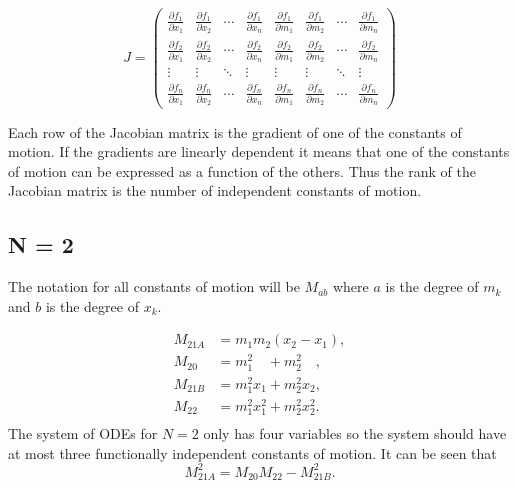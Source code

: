 \documentclass[english,master]{liumaiex}
\theoremstyle{plain}
\theoremstyle{definition}
\begin{document}
\begin{equation}
	J = 
	\begin{pmatrix}
		\frac{\partial f_1}{\partial x_1} & \frac{\partial f_1}{\partial x_2} & \cdots & \frac{\partial f_1}{\partial x_n} & \frac{\partial f_1}{\partial m_1} & \frac{\partial f_1}{\partial m_2} & \cdots & \frac{\partial f_1}{\partial m_n} \\
		\frac{\partial f_2}{\partial x_1} & \frac{\partial f_2}{\partial x_2} & \cdots & \frac{\partial f_2}{\partial x_n} & \frac{\partial f_2}{\partial m_1} & \frac{\partial f_2}{\partial m_2} & \cdots & \frac{\partial f_2}{\partial m_n} \\
		\vdots & \vdots & \ddots & \vdots & \vdots & \vdots & \ddots & \vdots \\
		\frac{\partial f_n}{\partial x_1} & \frac{\partial f_n}{\partial x_2} & \cdots & \frac{\partial f_n}{\partial x_n} & \frac{\partial f_n}{\partial m_1} & \frac{\partial f_n}{\partial m_2} & \cdots & \frac{\partial f_n}{\partial m_n}
	\end{pmatrix}
\end{equation}

Each row of the Jacobian matrix is the gradient of one of the constants of motion. If the gradients are linearly dependent it means that one of the constants of motion can be expressed as a function of the others. Thus the rank of the Jacobian matrix is the number of independent constants of motion.

\subsection*{N = 2}

The notation for all constants of motion will be $M_{ab}$ where $a$ is the degree of $m_k$ and $b$ is the degree of $x_k$.

\begin{align}
	M_{21A} &= m_1 m_2 (x_2 - x_1), \\
	M_{20\phantom{A}} &= m_1^2\phantom{x_1} + m_2^2\phantom{x_2}, \\
	M_{21B} &= m_1^2 x_1 + m_2^2 x_2, \\
	M_{22\phantom{A}} &= m_1^2 x_1^2 + m_2^2 x_2^2. \\
\end{align}
%
The system of ODEs for $N = 2$ only has four variables so the system should have at most three functionally independent constants of motion. It can be seen that
\begin{equation}
	M_{21A}^2 = M_{20}M_{22} - M_{21B}^2.
\end{equation}
\end{document}

